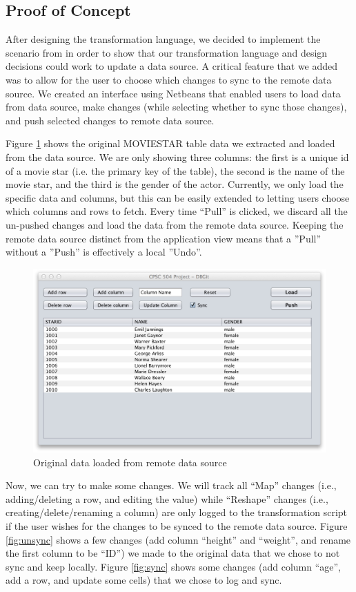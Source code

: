 \documentclass[12pt]{article}
\newcommand{\figref}[1]{Figure \ref{#1}}
\begin{document}
\subsection{Proof of Concept}
After designing the transformation language, we decided to implement the scenario from \cite{arniThesis} in order to show that our transformation language and design decisions could work to update a data source. A critical feature that we added was to allow for the user to choose which changes to sync to the remote data source. We created an interface using Netbeans that enabled users to load data from data source, make changes (while selecting whether to sync those changes), and push selected changes to remote data source.

\figref{fig:load} shows the original MOVIESTAR table data we extracted and loaded from the data source. We are only showing three columns: the first is a unique id of a movie star (i.e. the primary key of the table), the second is the name of the movie star, and the third is the gender of the actor. Currently, we only load the specific data and columns, but this can be easily extended to letting users choose which columns and rows to fetch. Every time ``Pull'' is clicked, we discard all the un-pushed changes and load the data from the remote data source.  Keeping the remote data source distinct from the application view means that a ''Pull'' without a ''Push'' is effectively a local ''Undo''.

\begin{figure} [!ht]
  \centering
  \includegraphics[width=0.9\columnwidth]{load}
  \caption{Original data loaded from remote data source}
  \label{fig:load}
\end{figure}

Now, we can try to make some changes. We will track all ``Map'' changes (i.e., adding/deleting a row, and editing the value) while ``Reshape'' changes (i.e.,  creating/delete/renaming a column) are only logged to the transformation script if the user wishes for the changes to be synced to the remote data source. \figref{fig:unsync} shows a few changes (add column ``height'' and ``weight'', and rename the first column to be ``ID'') we made to the original data that we chose to not sync and keep locally. \figref{fig:sync} shows some changes (add column ``age'', add a row, and update some cells) that we chose to log and sync. \\
\end{document}
